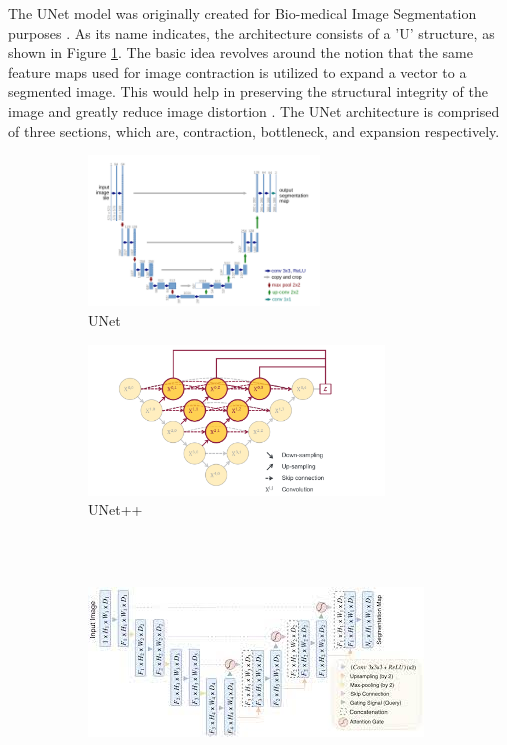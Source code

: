The UNet model was originally created for Bio-medical Image Segmentation purposes \cite{RFT2015}. As its name indicates, the architecture consists of a 'U' structure, as shown in Figure \ref{fig:unet}. The basic idea revolves around the notion that the same feature maps used for image contraction is utilized to expand a vector to a segmented image. This would help in preserving the structural integrity of the image and greatly reduce image distortion \cite{HSA2018}. The UNet architecture is comprised of three sections, which are, contraction, bottleneck, and expansion respectively.

\begin{figure}[H]
        \begin{subfigure}[b]{0.5\textwidth}
                \includegraphics[height=4cm]{Images/UNet.png}
                \caption{UNet \cite{UNT}}
                \label{fig:unet}
        \end{subfigure}%
        \begin{subfigure}[b]{0.5\textwidth}
                \includegraphics[height=4cm]{Images/UNet++.png}
                \caption{UNet++ \cite{UNT+}}
                \label{fig:unet++}
        \end{subfigure}\\\\
        \begin{center}
         \begin{subfigure}[b]{0.5\textwidth}
                \includegraphics[width=\linewidth]{Images/Att UNet.jpg}

\end{subfigure}
\end{center}
\end{figure}

